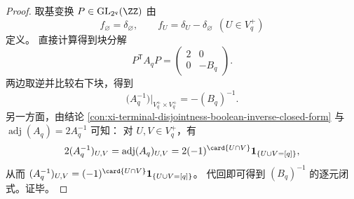 \begin{proof}
取基变换 \(P\in\mathrm{GL}_{2^q}(\ZZ)\) 由
\[
f_{\varnothing}=\delta_{\varnothing},\qquad
f_U=\delta_U-\delta_{\varnothing}\ \ (U\in V_q^+)
\]
定义。
直接计算得到块分解
\[
P^{\mathsf T}A_qP=\begin{pmatrix}2&0\\[2pt]0&-B_q\end{pmatrix}.
\]
两边取逆并比较右下块，得到
\[
\bigl(A_q^{-1}\bigr)\big|_{V_q^+\times V_q^+}=-(B_q)^{-1}.
\]
另一方面，由结论 \ref{con:xi-terminal-disjointness-boolean-inverse-closed-form} 与 \(\operatorname{adj}(A_q)=2A_q^{-1}\) 可知：
对 \(U,V\in V_q^+\)，有
\[
2(A_q^{-1})_{U,V}
=\operatorname{adj}(A_q)_{U,V}
=2(-1)^{\card{U\cap V}}\mathbf 1_{\{U\cup V=[q]\}},
\]
从而 \((A_q^{-1})_{U,V}=(-1)^{\card{U\cap V}}\mathbf 1_{\{U\cup V=[q]\}}\)。
代回即可得到 \((B_q)^{-1}\) 的逐元闭式。证毕。
\end{proof}

\endinput
